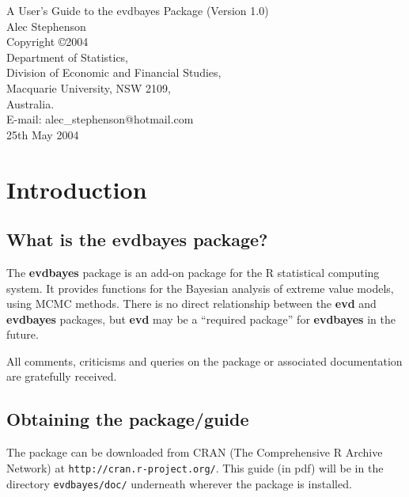 \documentclass[11pt,a4paper]{article}
\begin{document}
\sloppy

\begin{center}
\LARGE 
A User's Guide to the evdbayes Package (Version 1.0) \\
\Large
\vspace{0.2cm}
Alec Stephenson \\
\normalsize
Copyright \copyright 2004 \\
\vspace{0.2cm}
Department of Statistics,\\
Division of Economic and Financial Studies,\\
Macquarie University, NSW 2109,\\
Australia. \\
\vspace{0.2cm}
E-mail: alec\_stephenson@hotmail.com \\
25th May 2004 \\
\end{center}

\section{Introduction}
\setcounter{footnote}{0}

\subsection{What is the evdbayes package?}

The \textbf{evdbayes} package is an add-on package for the R \citep{R} statistical computing system.
It provides functions for the Bayesian analysis of extreme value models, using MCMC methods.
There is no direct relationship between the \textbf{evd} \citep{step:rn} and \textbf{evdbayes} packages, but \textbf{evd} may be a ``required package'' for \textbf{evdbayes} in the future.

All comments, criticisms and queries on the package or associated documentation are gratefully received.

\subsection{Obtaining the package/guide}

The package can be downloaded from CRAN (The Comprehensive R
Archive Network) at \verb+http://cran.r-project.org/+. 
This guide (in pdf) will be in the directory \verb+evdbayes/doc/+
underneath wherever the package is installed.
\end{document}
